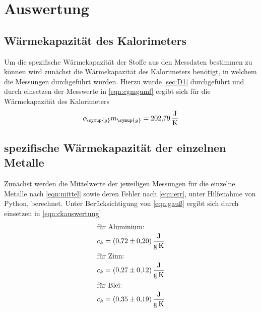 \section{Auswertung}
\label{sec:Auswertung}
\subsection{Wärmekapazität des Kalorimeters}
Um die spezifische Wärmekapazität der Stoffe aus den Messdaten bestimmen
zu können wird zunächst die Wärmekapazität des Kalorimeters benötigt,
in welchem die Messungen durchgeführt wurden. Hierzu wurde \ref{sec:D1}
durchgeführt und
durch einsetzen der Messwerte in \eqref{eqn:cgmgumf} ergibt sich für die Wärmekapazität des
Kalorimeters
\begin{equation*}
  c_\symup{g}m_\symup{g} = \SI{202,79}{\joule\per\kelvin}
\end{equation*}

\subsection{spezifische Wärmekapazität der einzelnen Metalle}
Zunächst werden die Mittelwerte der jeweiligen Messungen für die
einzelne Metalle nach \eqref{eqn:mittel} sowie deren Fehler nach \eqref{eqn:err}, unter Hilfenahme von
Python, berechnet.
Unter Berücksichtigung von \eqref{eqn:gauß} ergibt sich durch einsetzen
in \eqref{eqn:ckauswertung}
\begin{gather*}
  \intertext{für Aluminium:}
  c_k =\SI{0,72(20)}{\joule\per\gram\per\kelvin}\\
  \intertext{für Zinn:}
  c_k =\SI{0,27(12)}{\joule\per\gram\per\kelvin}\\
  \intertext{für Blei:}
  c_k =\SI{0,35(19)}{\joule\per\gram\per\kelvin}
\end{gather*}

